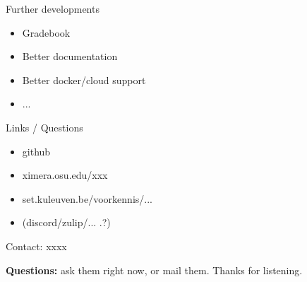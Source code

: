 \begin{frame}[t]{Further developments}

  \begin{itemize}
  \item Gradebook
  \item Better documentation
  \item Better docker/cloud support
  \item ...
  \end{itemize}

\end{frame}

\begin{frame}[t]{Links / Questions}

  \vfill
  \begin{itemize}
  \item github
  \item ximera.osu.edu/xxx
  \item set.kuleuven.be/voorkennis/...
  \item (discord/zulip/... .?)
  \end{itemize}
  \vfill

  Contact: xxxx

  \vfill
  \textbf{\Large Questions:} ask them right now, or mail them.
  \vfill
  Thanks for listening.

\end{frame}


